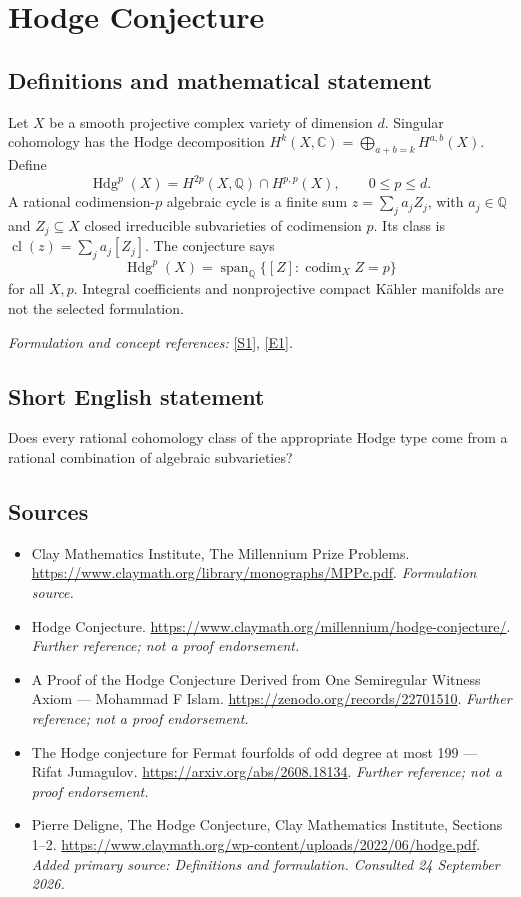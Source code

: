 \documentclass[11pt]{article}
\begin{document}
\section*{\texorpdfstring{Hodge Conjecture}{Hodge Conjecture}}\label{4}
\subsection{Definitions and mathematical statement}
Let $X$ be a smooth projective complex variety of dimension $d$. Singular cohomology has the Hodge decomposition $H^k(X,{\mathbb{C}})=\bigoplus_{a+b=k}H^{a,b}(X)$. Define
\[
 \operatorname{Hdg}^{p}(X)=H^{2p}(X,{\mathbb{Q}})\cap H^{p,p}(X),\qquad 0\le p\le d.
\]
A rational codimension-$p$ algebraic cycle is a finite sum $z=\sum_j a_j Z_j$, with $a_j\in{\mathbb{Q}}$ and $Z_j\subseteq X$ closed irreducible subvarieties of codimension $p$. Its class is $\operatorname{cl}(z)=\sum_j a_j[Z_j]$. The conjecture says
\[
 \operatorname{Hdg}^{p}(X)=\operatorname{span}_{{\mathbb{Q}}}\{[Z]:\operatorname{codim}_X Z=p\}
\]
for all $X,p$. Integral coefficients and nonprojective compact Kähler manifolds are not the selected formulation.
\par\smallskip\textit{Formulation and concept references:} \href{https://www.claymath.org/library/monographs/MPPc.pdf}{[S1]}, \href{https://www.claymath.org/wp-content/uploads/2022/06/hodge.pdf}{[E1]}.

\subsection{Short English statement}
Does every rational cohomology class of the appropriate Hodge type come from a rational combination of algebraic subvarieties?
\subsection{Sources}
\begin{itemize}
\item[S1]Clay Mathematics Institute, The Millennium Prize Problems.
\url{https://www.claymath.org/library/monographs/MPPc.pdf}.
\textit{Formulation source.}
\item[S2]Hodge Conjecture.
\url{https://www.claymath.org/millennium/hodge-conjecture/}.
\textit{Further reference; not a proof endorsement.}
\item[S3]A Proof of the Hodge Conjecture Derived from One Semiregular Witness Axiom — Mohammad F Islam.
\url{https://zenodo.org/records/22701510}.
\textit{Further reference; not a proof endorsement.}
\item[S4]The Hodge conjecture for Fermat fourfolds of odd degree at most 199 — Rifat Jumagulov.
\url{https://arxiv.org/abs/2608.18134}.
\textit{Further reference; not a proof endorsement.}
\item[E1]Pierre Deligne, The Hodge Conjecture, Clay Mathematics Institute, Sections 1--2.
\url{https://www.claymath.org/wp-content/uploads/2022/06/hodge.pdf}.
\textit{Added primary source: Definitions and formulation. Consulted 24 September 2026.}
\end{itemize}
\end{document}
